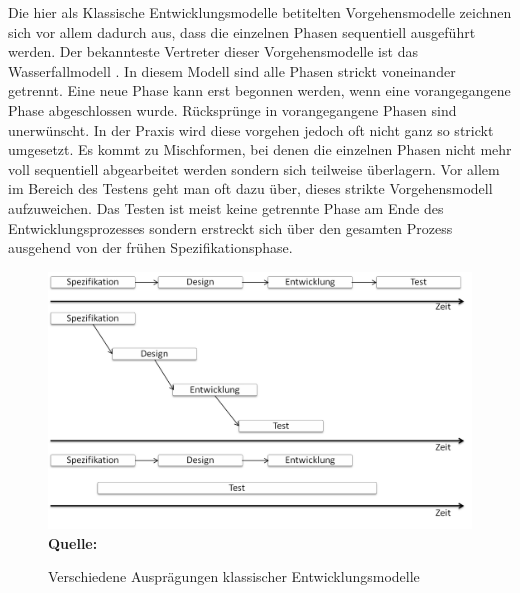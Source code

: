 Die hier als Klassische Entwicklungsmodelle betitelten Vorgehensmodelle zeichnen sich vor allem dadurch aus, dass die einzelnen Phasen sequentiell ausgeführt werden. Der bekannteste Vertreter dieser Vorgehensmodelle ist das Wasserfallmodell \cite{royce_managing_1987}. In diesem Modell sind alle Phasen strickt voneinander getrennt. Eine neue Phase kann erst begonnen werden, wenn eine vorangegangene Phase abgeschlossen wurde. Rücksprünge in vorangegangene Phasen sind unerwünscht. In der Praxis wird diese vorgehen jedoch oft nicht ganz so strickt umgesetzt. Es kommt zu Mischformen, bei denen die einzelnen Phasen nicht mehr voll sequentiell abgearbeitet werden sondern sich teilweise überlagern. Vor allem im Bereich des Testens geht man oft dazu über, dieses strikte Vorgehensmodell aufzuweichen. Das Testen ist meist keine getrennte Phase am Ende des Entwicklungsprozesses sondern erstreckt sich über den gesamten Prozess ausgehend von der frühen Spezifikationsphase.

\begin{figure}[htb]
  \centering  
  \includegraphics[scale=0.7]{img/sequentielleentwicklungsmodelle.png}\\
  \footnotesize\sffamily\textbf{Quelle:} \cite[vgl. S.22]{seidl_basiswissen_2012}
  \caption{Verschiedene Ausprägungen klassischer Entwicklungsmodelle}
  \label{fig:verschiedene_auspraegungen_klassischer_entwicklungsmodelle}
\end{figure}

